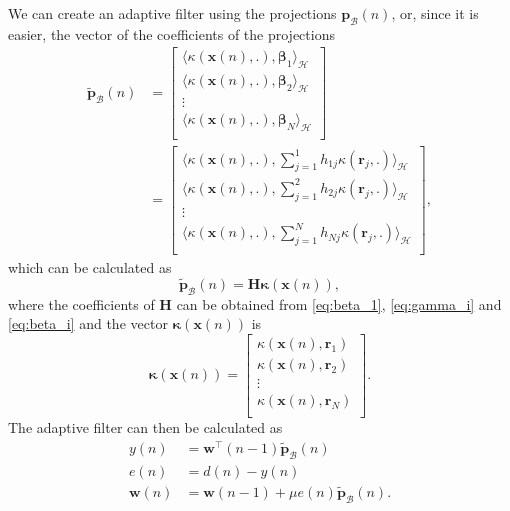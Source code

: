 We can create an adaptive filter using the projections $\mathbf{p}_{\mathcal{B}}(n)$, or, since it is easier, the vector of the coefficients of the projections 
\begin{align}
    \tilde{\mathbf{p}}_\mathcal{B}(n) &= \begin{bmatrix}
        \langle\kappa(\mathbf{x}(n),.),\boldsymbol{\beta}_1\rangle_\mathcal{H}\\
        \langle\kappa(\mathbf{x}(n),.),\boldsymbol{\beta}_2\rangle_\mathcal{H}\\
        \vdots\\
        \langle\kappa(\mathbf{x}(n),.),\boldsymbol{\beta}_N\rangle_\mathcal{H}\\
    \end{bmatrix} \\&= \begin{bmatrix}
        \langle\kappa(\mathbf{x}(n),.),\sum_{j=1}^{1}h_{1j}\kappa(\mathbf{r}_j,.)\rangle_\mathcal{H}\\
        \langle\kappa(\mathbf{x}(n),.),\sum_{j=1}^{2}h_{2j}\kappa(\mathbf{r}_j,.)\rangle_\mathcal{H}\\
        \vdots\\
        \langle\kappa(\mathbf{x}(n),.),\sum_{j=1}^{N}h_{Nj}\kappa(\mathbf{r}_j,.)\rangle_\mathcal{H}\\
    \end{bmatrix},      
\end{align}
which can be calculated as
\begin{equation}
    \tilde{\mathbf{p}}_{\mathcal{B}}(n) =\mathbf{H}\boldsymbol{\kappa}(\mathbf{x}(n)),
\end{equation}
where the coefficients of $\mathbf{H}$ can be obtained from \eqref{eq:beta_1}, \eqref{eq:gamma_i} and \eqref{eq:beta_i} and the vector $\boldsymbol{\kappa}(\mathbf{x}(n))$ is
\begin{equation}
    \boldsymbol{\kappa}(\mathbf{x}(n)) = \begin{bmatrix}
        \kappa(\mathbf{x}(n),\mathbf{r}_1)\\
        \kappa(\mathbf{x}(n),\mathbf{r}_2)\\
        \vdots\\
        \kappa(\mathbf{x}(n),\mathbf{r}_N)\\
    \end{bmatrix}.      
\end{equation}
The adaptive filter can then be calculated as
\begin{align}
    y(n) &= \mathbf{w}^{\top}(n-1)\tilde{\mathbf{p}}_{\mathcal{B}}(n)\\
    e(n) &= d(n) - y(n)\\
    \mathbf{w}(n) &= \mathbf{w}(n-1) + \mu e(n)\tilde{\mathbf{p}}_{\mathcal{B}}(n).
\end{align}


